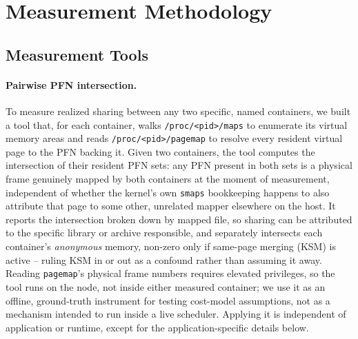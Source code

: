 \documentclass[sigplan,10pt,natbib=false]{acmart}
\newcommand{\procpath}[1]{\texttt{/proc/\allowbreak<pid>/\allowbreak#1}}
\begin{document}
\section{Measurement Methodology}
\label{sec:methodology}

\subsection{Measurement Tools}
\label{sec:tool}

\paragraph{Pairwise PFN intersection.}
To measure realized sharing between any two specific, named
containers, we built a tool that, for each container, walks
\procpath{maps} to enumerate its virtual memory areas and reads
\procpath{pagemap} \cite{corbet2007pss} to resolve every resident
virtual page to the PFN backing it. Given two containers, the tool
computes the intersection of their resident PFN sets: any PFN present
in both sets is a physical frame genuinely mapped by both containers
at the moment of measurement, independent of whether the kernel's own
\texttt{smaps} bookkeeping happens to also attribute that page to some
other, unrelated mapper elsewhere on the host. It reports the
intersection broken down by mapped file, so sharing can be attributed
to the specific library or archive responsible, and separately
intersects each container's \emph{anonymous} memory, non-zero only if
same-page merging (KSM) is active -- ruling KSM in or out as a
confound rather than assuming it away. Reading \texttt{pagemap}'s
physical frame numbers requires elevated privileges, so the tool runs
on the node, not inside either measured container; we use it as an
offline, ground-truth instrument for testing cost-model assumptions,
not as a mechanism intended to run inside a live scheduler. Applying
it is independent of application or runtime, except for the
application-specific details below.
\end{document}
